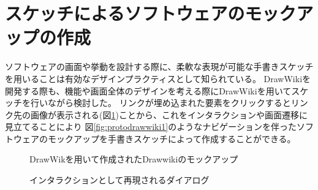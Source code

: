 \section{スケッチによるソフトウェアのモックアップの作成}
\label{drawiki:mockup}
ソフトウェアの画面や挙動を設計する際に、柔軟な表現が可能な手書きスケッチを用いることは有効なデザインプラクティスとして知られている。
DrawWikiを開発する際も、機能や画面全体のデザインを考える際にDrawWikiを用いてスケッチを行いながら検討した。
リンクが埋め込まれた要素をクリックするとリンク先の画像が表示される(図\ref{fig:protodrawwiki2})ことから、これをインタラクションや画面遷移に見立てることにより
図\ref{fig:protodrawwiki1}のようなナビゲーションを伴ったソフトウェアのモックアップを手書きスケッチによって作成することができる。

\begin{figure}[H] \begin{minipage}{0.5\hsize}
                      \begin{center} 
                      \end{center} \caption{DrawWikを用いて作成されたDrawwikiのモックアップ} \label{fig:protodrawwiki1}
\end{minipage} \begin{minipage}{0.5\hsize}
                   \begin{center} 
                   \end{center} \caption{インタラクションとして再現されるダイアログ} \label{fig:protodrawwiki2}
\end{minipage}
\end{figure}


